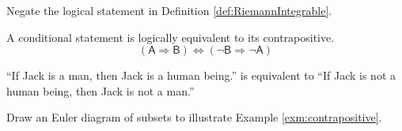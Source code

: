 \begin{exc}
 Negate the logical statement in Definition \ref{def:RiemannIntegrable}.
\end{exc}


\begin{axm}[Contraposition]
  \label{axm:contrapositive}
  A conditional statement is logically equivalent to its
  contrapositive.
  \begin{equation}
    \label{eq:contraposition}
    (\mathsf{A}\Rightarrow \mathsf{B}) \Leftrightarrow
    (\neg \mathsf{B}\Rightarrow \neg \mathsf{A})
  \end{equation}
\end{axm}

\begin{exm}
  \label{exm:contrapositive}
  ``If Jack is a man, then Jack is a human being.''
  is equivalent to ``If Jack is not a human being,
  then Jack is not a man.''
\end{exm}

\begin{exc}
  Draw an Euler diagram of subsets to illustrate Example \ref{exm:contrapositive}.
\end{exc}

